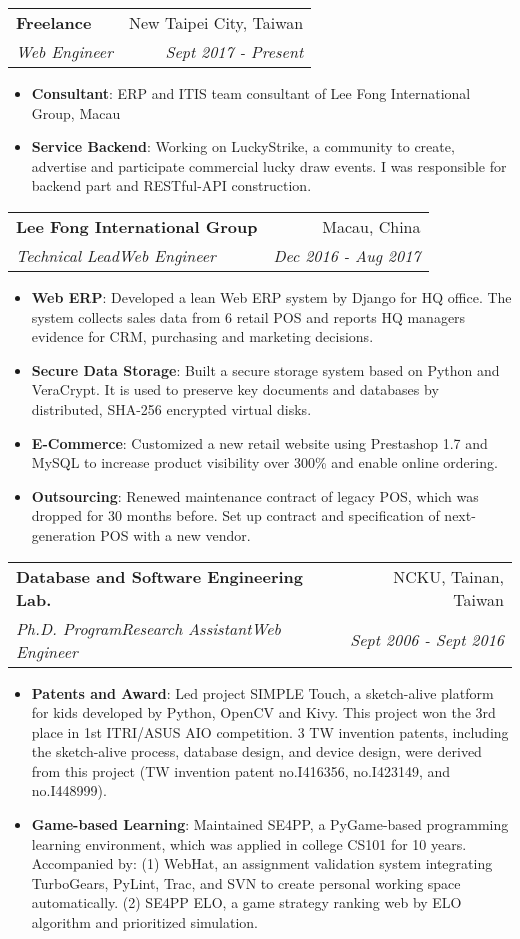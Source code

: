 \documentclass[a4paper,11pt]{article}
\makeatletter
\newcommand{\resumeItem}[2]{
  \item{
    \textbf{\small#1}{: \small#2 \vspace{-2pt}}
  }
}
\newcommand{\resumeSubheading}[4]{
  \vspace{-1pt}\item
    \begin{tabular*}{0.97\textwidth}{l@{\extracolsep{\fill}}r}
      \textbf{#1} & #2 \\
      \textit{#3} & \textit{ #4} \\
    \end{tabular*}\vspace{-5pt}
}
\newcommand{\resumeItemListStart}{\begin{itemize}}
\newcommand{\resumeItemListEnd}{\end{itemize}\vspace{-5pt}}
\newcommand\smalldiv{\smash{\raisebox{0.29ex}{\scalebox{0.8}{/}}}}
\makeatother
\begin{document}
\begin{CJK}{UTF8}{bkai}
    \resumeSubheading
      {Freelance}{New Taipei City, Taiwan}
      {Web Engineer}{Sept 2017 - Present}
      \resumeItemListStart
        \resumeItem{Consultant}
          {ERP and IT\smalldiv IS team consultant of Lee Fong International Group, Macau}
        \resumeItem{Service Backend}
          {Working on LuckyStrike, a community to create, advertise and participate commercial lucky draw events. I was responsible for backend part and RESTful-API construction.}
      \resumeItemListEnd

    \resumeSubheading
      {Lee Fong International Group}{Macau, China}
      {Technical Lead\smalldiv Web Engineer}{Dec 2016 - Aug 2017}
      \resumeItemListStart
        \resumeItem{Web ERP}
          {Developed a lean Web ERP system by Django for HQ office. The system collects sales data from 6 retail POS and reports HQ managers evidence for CRM, purchasing and marketing decisions.}
        \resumeItem{Secure Data Storage}
          {Built a secure storage system based on Python and VeraCrypt. It is used to preserve key documents and databases by distributed, SHA-256 encrypted virtual disks.}
        \resumeItem{E-Commerce}
          {Customized a new retail website using Prestashop 1.7 and MySQL to increase product visibility over 300\% and enable online ordering.}
        \resumeItem{Outsourcing}
          {Renewed maintenance contract of legacy POS, which was dropped for 30 months before. Set up contract and specification of next-generation POS with a new vendor.}
      \resumeItemListEnd

    \resumeSubheading
      {Database and Software Engineering Lab.}{NCKU, Tainan, Taiwan}
      {Ph.D. Program\smalldiv Research Assistant\smalldiv Web Engineer}{Sept 2006 - Sept 2016}
      \resumeItemListStart
        \resumeItem{Patents and Award}
          {Led project SIMPLE Touch, a sketch-alive platform for kids developed by Python, OpenCV and Kivy. This project won the 3rd place in 1st ITRI/ASUS AIO competition. 3 TW invention patents, including the sketch-alive process, database design, and device design, were derived from this project (TW invention patent no.I416356, no.I423149, and no.I448999).}
        \resumeItem{Game-based Learning}
          {Maintained SE4PP, a PyGame-based programming learning environment, which was applied in college CS101 for 10 years. Accompanied by: (1) WebHat, an assignment validation system integrating TurboGears, PyLint, Trac, and SVN to create personal working space automatically. (2) SE4PP ELO, a game strategy ranking web by ELO algorithm and prioritized simulation.}
      \resumeItemListEnd


\end{CJK}
\end{document}
